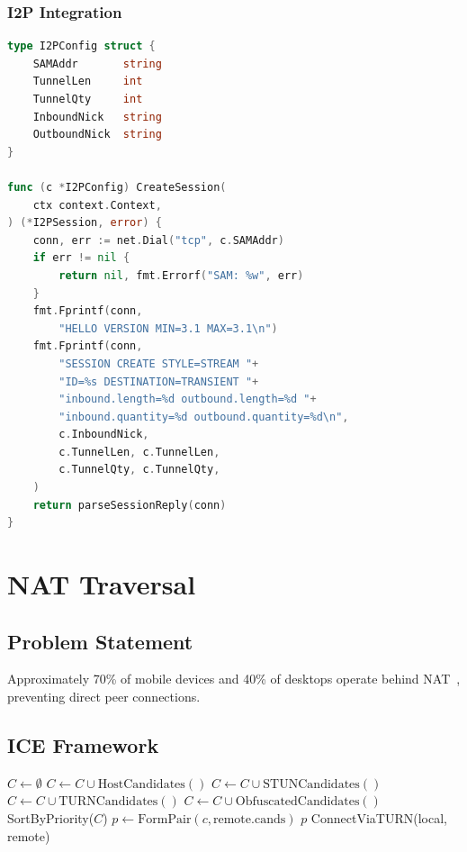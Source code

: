 \documentclass[11pt,a4paper]{article}
\begin{document}
\subsubsection{I2P Integration}

\begin{lstlisting}[language=Go,caption={I2P Tunnel via SAM v3.1}]
type I2PConfig struct {
    SAMAddr       string
    TunnelLen     int
    TunnelQty     int
    InboundNick   string
    OutboundNick  string
}

func (c *I2PConfig) CreateSession(
    ctx context.Context,
) (*I2PSession, error) {
    conn, err := net.Dial("tcp", c.SAMAddr)
    if err != nil {
        return nil, fmt.Errorf("SAM: %w", err)
    }
    fmt.Fprintf(conn,
        "HELLO VERSION MIN=3.1 MAX=3.1\n")
    fmt.Fprintf(conn,
        "SESSION CREATE STYLE=STREAM "+
        "ID=%s DESTINATION=TRANSIENT "+
        "inbound.length=%d outbound.length=%d "+
        "inbound.quantity=%d outbound.quantity=%d\n",
        c.InboundNick,
        c.TunnelLen, c.TunnelLen,
        c.TunnelQty, c.TunnelQty,
    )
    return parseSessionReply(conn)
}
\end{lstlisting}

\section{NAT Traversal}
\label{sec:nat}

\subsection{Problem Statement}

Approximately 70\% of mobile devices and 40\% of desktops operate behind
NAT~\cite{ford2005p2p}, preventing direct peer connections.

\subsection{ICE Framework}

\begin{algorithm}[H]
\caption{Extended ICE Connectivity Check}
\label{alg:ice}
\begin{algorithmic}[1]
    \State $C \gets \emptyset$
    \State $C \gets C \cup \mathrm{HostCandidates}()$
    \State $C \gets C \cup \mathrm{STUNCandidates}()$
    \State $C \gets C \cup \mathrm{TURNCandidates}()$
    \State $C \gets C \cup \mathrm{ObfuscatedCandidates}()$
    \State SortByPriority($C$)
        \State $p \gets \mathrm{FormPair}(c, \mathrm{remote.cands})$
            \State \Return $p$
        \EndIf
    \EndFor
    \State \Return ConnectViaTURN(local, remote)
\EndFunction
\end{algorithmic}
\end{algorithm}
\end{document}
